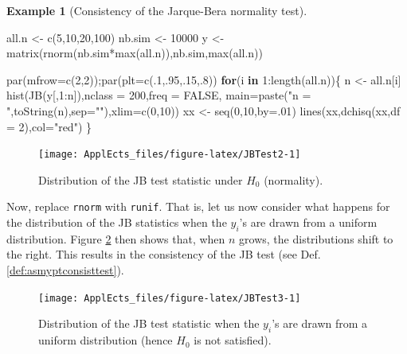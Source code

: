 \documentclass[
  12pt,
]{book}
\newenvironment{Shaded}{\begin{snugshade}}{\end{snugshade}}
\newcommand{\AttributeTok}[1]{\textcolor[rgb]{0.77,0.63,0.00}{#1}}
\newcommand{\ConstantTok}[1]{\textcolor[rgb]{0.00,0.00,0.00}{#1}}
\newcommand{\ControlFlowTok}[1]{\textcolor[rgb]{0.13,0.29,0.53}{\textbf{#1}}}
\newcommand{\DecValTok}[1]{\textcolor[rgb]{0.00,0.00,0.81}{#1}}
\newcommand{\FunctionTok}[1]{\textcolor[rgb]{0.00,0.00,0.00}{#1}}
\newcommand{\NormalTok}[1]{#1}
\newcommand{\OtherTok}[1]{\textcolor[rgb]{0.56,0.35,0.01}{#1}}
\newcommand{\SpecialCharTok}[1]{\textcolor[rgb]{0.00,0.00,0.00}{#1}}
\newcommand{\StringTok}[1]{\textcolor[rgb]{0.31,0.60,0.02}{#1}}
\theoremstyle{definition}
\theoremstyle{definition}
\newtheorem{example}{Example}[chapter]
\theoremstyle{definition}
\theoremstyle{definition}
\theoremstyle{remark}
\begin{document}
\begin{example}[Consistency of the Jarque-Bera normality test]
\begin{Shaded}
\begin{Highlighting}[]
\NormalTok{all.n }\OtherTok{\textless{}{-}} \FunctionTok{c}\NormalTok{(}\DecValTok{5}\NormalTok{,}\DecValTok{10}\NormalTok{,}\DecValTok{20}\NormalTok{,}\DecValTok{100}\NormalTok{)}
\NormalTok{nb.sim }\OtherTok{\textless{}{-}} \DecValTok{10000}
\NormalTok{y }\OtherTok{\textless{}{-}} \FunctionTok{matrix}\NormalTok{(}\FunctionTok{rnorm}\NormalTok{(nb.sim}\SpecialCharTok{*}\FunctionTok{max}\NormalTok{(all.n)),nb.sim,}\FunctionTok{max}\NormalTok{(all.n))}

\FunctionTok{par}\NormalTok{(}\AttributeTok{mfrow=}\FunctionTok{c}\NormalTok{(}\DecValTok{2}\NormalTok{,}\DecValTok{2}\NormalTok{));}\FunctionTok{par}\NormalTok{(}\AttributeTok{plt=}\FunctionTok{c}\NormalTok{(.}\DecValTok{1}\NormalTok{,.}\DecValTok{95}\NormalTok{,.}\DecValTok{15}\NormalTok{,.}\DecValTok{8}\NormalTok{))}
\ControlFlowTok{for}\NormalTok{(i }\ControlFlowTok{in} \DecValTok{1}\SpecialCharTok{:}\FunctionTok{length}\NormalTok{(all.n))\{}
\NormalTok{  n }\OtherTok{\textless{}{-}}\NormalTok{ all.n[i]}
  \FunctionTok{hist}\NormalTok{(}\FunctionTok{JB}\NormalTok{(y[,}\DecValTok{1}\SpecialCharTok{:}\NormalTok{n]),}\AttributeTok{nclass =} \DecValTok{200}\NormalTok{,}\AttributeTok{freq =} \ConstantTok{FALSE}\NormalTok{,}
       \AttributeTok{main=}\FunctionTok{paste}\NormalTok{(}\StringTok{"n = "}\NormalTok{,}\FunctionTok{toString}\NormalTok{(n),}\AttributeTok{sep=}\StringTok{""}\NormalTok{),}\AttributeTok{xlim=}\FunctionTok{c}\NormalTok{(}\DecValTok{0}\NormalTok{,}\DecValTok{10}\NormalTok{))}
\NormalTok{  xx }\OtherTok{\textless{}{-}} \FunctionTok{seq}\NormalTok{(}\DecValTok{0}\NormalTok{,}\DecValTok{10}\NormalTok{,}\AttributeTok{by=}\NormalTok{.}\DecValTok{01}\NormalTok{)}
  \FunctionTok{lines}\NormalTok{(xx,}\FunctionTok{dchisq}\NormalTok{(xx,}\AttributeTok{df =} \DecValTok{2}\NormalTok{),}\AttributeTok{col=}\StringTok{"red"}\NormalTok{)}
\NormalTok{\}}
\end{Highlighting}
\end{Shaded}

\begin{figure}
\texttt{[image: ApplEcts\_files/figure-latex/JBTest2-1]} \caption{Distribution of the JB test statistic under $H_0$ (normality).}\label{fig:JBTest2}
\end{figure}

Now, replace \texttt{rnorm} with \texttt{runif}. That is, let us now consider what happens for the distribution of the JB statistics when the \(y_i\)'s are drawn from a uniform distribution. Figure \ref{fig:JBTest3} then shows that, when \(n\) grows, the distributions shift to the right. This results in the consistency of the JB test (see Def. \ref{def:asmyptconsisttest}).

\begin{figure}
\texttt{[image: ApplEcts\_files/figure-latex/JBTest3-1]} \caption{Distribution of the JB test statistic when the $y_i$'s are drawn from a uniform distribution (hence $H_0$ is not satisfied).}\label{fig:JBTest3}
\end{figure}

\end{example}
\end{document}

